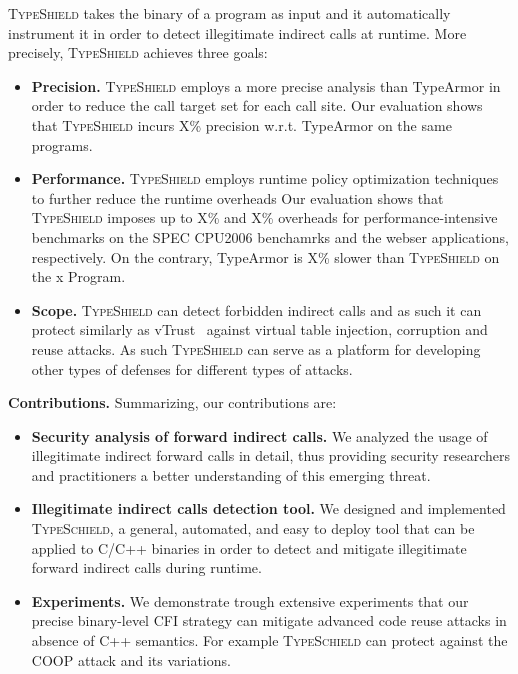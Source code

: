\textsc{TypeShield} takes the binary of a program as input and it automatically instrument it in order
to detect illegitimate indirect calls at runtime. 
More precisely, \textsc{TypeShield} achieves three goals:
\begin{itemize}
 \item \textbf{Precision.} \textsc{TypeShield} employs a more precise analysis than TypeArmor in order to reduce the call target set for each 
               call site. Our evaluation shows that \textsc{TypeShield} incurs X\% precision w.r.t. TypeArmor on the same programs.
 \item \textbf{Performance.} \textsc{TypeShield} employs runtime policy optimization techniques to further reduce the runtime overheads
              Our evaluation shows that \textsc{TypeShield} imposes up to X\% and X\% overheads for performance-intensive benchmarks on the
              SPEC CPU2006 benchamrks and the webser applications, respectively. On
              the contrary, TypeArmor is X\% slower than \textsc{TypeShield}
              on the x Program.
 \item \textbf{Scope.} \textsc{TypeShield} can detect forbidden indirect calls and as such it can protect similarly as vTrust~\cite{zhang:vtrust} against
              virtual table injection, corruption and reuse attacks. As such \textsc{TypeShield} can serve as a platform for developing other types of defenses for different 
              types of attacks.
\end{itemize}

\textbf{Contributions.} 
Summarizing, our contributions are:
\label{Contribution}
\begin{itemize}
 \item \textbf{Security analysis of forward indirect calls.} 
 We analyzed the usage of illegitimate indirect forward calls in detail,
 thus providing security researchers and practitioners a better understanding of this emerging
 threat.

 \item \textbf{Illegitimate indirect calls detection tool.}
 We designed and implemented \textsc{TypeSchield}, a general, automated, and easy to deploy tool
 that can be applied to C/C++ binaries in order to detect and mitigate illegitimate forward indirect calls 
 during runtime. 
 
 \item \textbf{Experiments.} We demonstrate trough extensive experiments that our precise
 binary-level CFI strategy can mitigate advanced code reuse attacks in absence of C++ semantics.
 For example \textsc{TypeSchield} can protect against the COOP attack and its variations.
\end{itemize}

